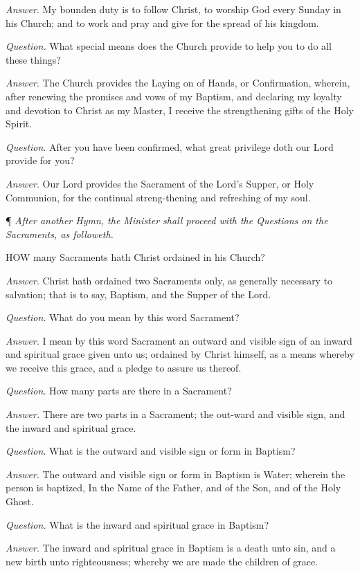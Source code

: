 \emph{Answer}. My bounden duty is to follow Christ,
to worship God every Sunday in his Church; and to work and pray and give
for the spread of his kingdom.

\emph{Question.} What special means does the Church
provide to help you to do all these things?

\emph{Answer}. The Church provides the Laying on
of Hands, or Confirmation, wherein, after renewing the promises and vows
of my Baptism, and declaring my loyalty and devotion to Christ as my Master,
I receive the strengthening gifts of the Holy Spirit.

\emph{Question}. After you have been confirmed, what
great privilege doth our Lord provide for you?

\emph{Answer}. Our Lord provides the Sacrament of
the Lord’s Supper, or Holy Communion, for the continual streng-thening
and refreshing of my soul. 

¶
\emph{After another Hymn, the Minister shall proceed with the Questions
on the Sacraments, as followeth.}

HOW
many Sacraments hath Christ ordained in his Church?

\emph{Answer}. Christ hath ordained two Sacraments
only, as generally necessary to salvation; that is to say, Baptism, and
the Supper of the Lord.

\emph{Question}. What do you mean by this word Sacrament?

\emph{Answer}. I mean by this word Sacrament an outward
and visible sign of an inward and spiritual grace given unto us; ordained
by Christ himself, as a means whereby we receive this grace, and a pledge
to assure us thereof.

\emph{Question}. How many parts are there in a Sacrament?

\emph{Answer.} There are two parts in a Sacrament;
the out-ward and visible sign, and the inward and spiritual grace.

\emph{Question}. What is the outward and visible
sign or form in Baptism?

\emph{Answer}. The outward and visible sign or form
in Baptism is Water; wherein the person is baptized, In the Name of the
Father, and of the Son, and of the Holy Ghost.

\emph{Question.} What is the inward and spiritual
grace in Baptism?

\emph{Answer}. The inward and spiritual grace in
Baptism is a death unto sin, and a new birth unto righteousness; whereby
we are made the children of grace.

